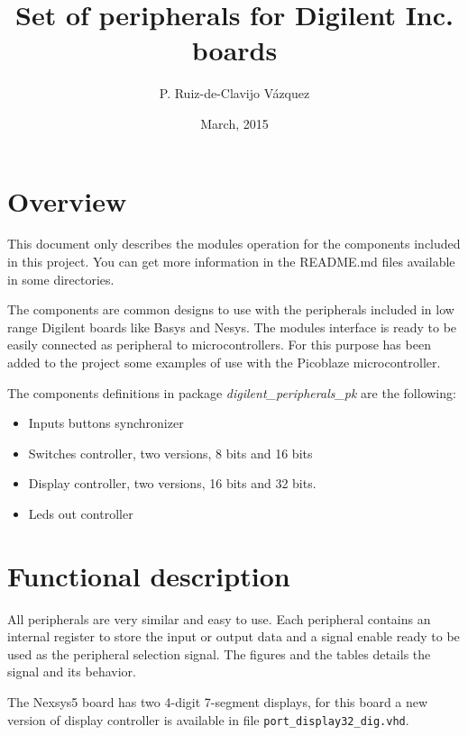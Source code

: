 \documentclass[10pt,a4paper,onecolumn]{article}
\begin{document}
\title{Set of peripherals for Digilent Inc. boards}

\author{P. Ruiz-de-Clavijo V\'azquez}
\date{March, 2015}

\maketitle


\section*{Overview}

This document only describes the modules operation for the components included 
in this project. You can get more information in the README.md files 
available in some directories.

The components are common designs to use with the peripherals included in low 
range Digilent boards like Basys and Nesys. 
The modules interface is ready to be easily connected as  peripheral to 
microcontrollers. For this purpose has been added to the project some examples 
of use with the Picoblaze microcontroller.

The components definitions in package \emph{digilent\_peripherals\_pk} are the 
following:

\begin{itemize}
\item Inputs buttons synchronizer
\item Switches controller, two versions, 8 bits and 16 bits
\item Display controller, two versions, 16 bits and 32 bits.
\item Leds out controller
\end{itemize}

\section*{Functional description}

All peripherals are very similar and easy to use. Each peripheral contains an 
internal register to store the input or output data and a signal enable ready to 
be used as the peripheral selection signal. The figures and the tables details 
the signal and its behavior.

The Nexsys5 board has two 4-digit 7-segment displays, for this board a new 
version of display controller is available in file 
\texttt{port\_display32\_dig.vhd}.
\end{document}

